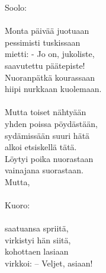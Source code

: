 
            Soolo: \\
\hspace{10mm} \\
            Monta päivää juotuaan \\
            pessimisti tuskissaan \\
            mietti: - Jo on, jukoliste, \\
            saavutettu päätepiste! \\
            Nuoranpätkä kourassaan \\
            hiipi nurkkaan kuolemaan. \\
\hspace{10mm} \\
            Mutta toiset nähtyään \\
            yhden poissa pöydästään, \\
            sydämissään suuri hätä \\
            alkoi etsiskellä tätä. \\
            Löytyi poika nuorastaan \\
            vainajana suorastaan. \\
            Mutta, \\
\hspace{10mm} \\
            Kuoro: \\
\hspace{10mm} \\
            saatuansa spriitä, \\
            virkistyi hän siitä, \\
            kohottaen lasiaan \\
            virkkoi: – Veljet, asiaan! \\
